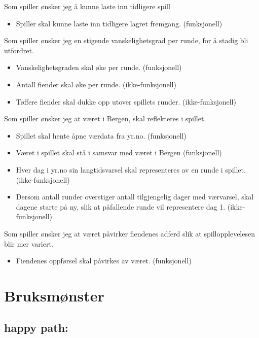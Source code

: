 \documentclass[norsk,a4paper,12 pt]{article}
\begin{document}
Som spiller ønsker jeg å kunne laste inn tidligere spill
\begin{itemize}

\item Spiller skal kunne laste inn tidligere lagret fremgang. (funksjonell)
\end{itemize}
Som spiller ønsker jeg en stigende vanskelighetsgrad per runde, for å stadig bli utfordret.
\begin{itemize}
\item Vanskelighetsgraden skal øke per runde. (funksjonell)

\item Antall fiender skal øke per runde. (ikke-funksjonell)

\item Tøffere fiender skal dukke opp utover spillets runder. (ikke-funksjonell)
\end{itemize}
Som spiller ønsker jeg at været i Bergen, skal reflekteres i spillet.
\begin{itemize}

\item Spillet skal hente åpne værdata fra yr.no. (funksjonell)

\item Været i spillet skal stå i samsvar med været i Bergen (funksjonell)

\item Hver dag i yr.no sin langtidsvarsel skal representeres av en runde i spillet.(ikke-funksjonell)

\item Dersom antall runder overstiger antall tilgjengelig dager med værvarsel, skal dagene starte på ny, slik at påfallende runde vil representere dag 1. (ikke-funksjonell)

\end{itemize}
Som spiller ønsker jeg at været påvirker fiendenes adferd slik at spillopplevelesen blir mer variert.
\begin{itemize}
\item Fiendenes oppførsel skal påvirkes av været. (funksjonell)

\end{itemize}

\section{Bruksmønster}


\subsection{ happy path:}
\end{document}
